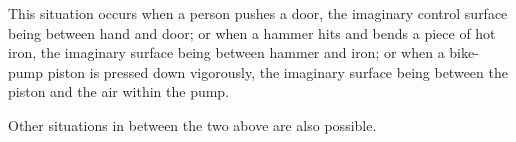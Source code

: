 \documentclass[a4paper,12pt,%
onecolumn,oneside,%
british%
]{memoir}
\renewcommand*{\|}[1][]{\nonscript\:#1\vert\nonscript\:\mathopen{}}
\begin{document}
This situation occurs when a person pushes a door, the imaginary control surface being between hand and door; or when a hammer hits and bends a piece of hot iron, the imaginary surface being between hammer and iron; or when a bike-pump piston is pressed down vigorously, the imaginary surface being between the piston and the air within the pump.
%
%

Other situations in between the two above are also possible.

\medskip
\end{document}
